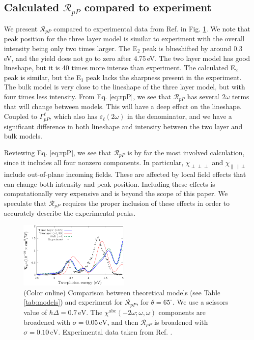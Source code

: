 \documentclass[prb,superscriptaddress,showpacs,twocolumn,letterpaper]{revtex4}
\begin{document}
\subsection{Calculated \texorpdfstring{$\mathcal{R}_{pP}$}{RpP} compared to
experiment}\label{sec:RpP}

We present $\mathcal{R}_{pP}$ compared to experimental data from Ref.
 in Fig. \ref{fig:RpP}. We note that peak position for
the three layer model is similar to experiment with the overall intensity being
only two times larger. The E$_{2}$ peak is blueshifted by around 0.3\,eV, and
the yield does not go to zero after 4.75\,eV. The two layer model has good
lineshape, but it is 40 times more intense than experiment. The calculated
E$_{2}$ peak is similar, but the E$_{1}$ peak lacks the sharpness present in the
experiment. The bulk model is very close to the lineshape of the three layer
model, but with four times less intensity. From Eq. \eqref{eq:rpP}, we see that
$\mathcal{R}_{pP}$ has several $2\omega$ terms that will change between models.
This will have a deep effect on the lineshape. Coupled to $\Gamma^{\ell}_{pP}$,
which also has $\varepsilon_{\ell}(2\omega)$ in the denominator, and we have a
significant difference in both lineshape and intensity between the two layer and
bulk models.

Reviewing Eq. \eqref{eq:rpP}, we see that $\mathcal{R}_{pP}$ is by far the most
involved calculation, since it includes all four nonzero components. In
particular, $\chi_{\perp\perp\perp}$ and $\chi_{\parallel\parallel\perp}$
include out-of-plane incoming fields. These are affected by local field effects
that can change both intensity and peak
position.\cite{tancognedejean:tel-01235611} Including these effects is
computationally very expensive and is beyond the scope of this paper. We
speculate that $\mathcal{R}_{pP}$ requires the proper inclusion of these effects
in order to accurately describe the experimental peaks.

\begin{figure}[b]
\centering
\includegraphics[width=0.48\textwidth]{fig7}
\caption{(Color online) Comparison between theoretical models (see Table
\ref{tab:models}) and experiment for $\mathcal{R}_{pP}$, for
$\theta=65^{\circ}$. We use a scissors value of $\hbar\Delta = 0.7\,\text{eV}$.
The $\chi^{\mathrm{abc}}(-2\omega;\omega,\omega)$ components are broadened with
$\sigma=0.05\,\text{eV}$, and then $\mathcal{R}_{pP}$ is broadened with
$\sigma=0.10\,\text{eV}$. Experimental data taken from Ref.
.\label{fig:RpP}}
\end{figure}
\end{document}
